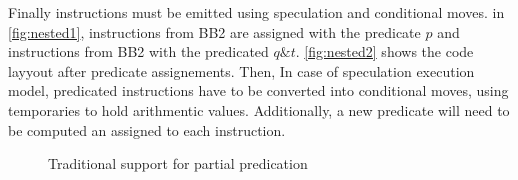 Finally instructions must be emitted using speculation and conditional moves. in \ref{fig:nested1}, instructions from BB2 are assigned with the predicate $p$ and instructions from BB2 with the predicated $q\&t$. \ref{fig:nested2} shows the code layyout after predicate assignements. Then, In case of speculation execution model, predicated instructions have to be converted into conditional moves, using temporaries to hold arithmentic values. Additionally, a new predicate will need to be computed an assigned to each instruction.

\begin{figure}
\centering
\caption{Traditional support for partial predication}
\label{fig:trad_part_pred}
\end{figure}


